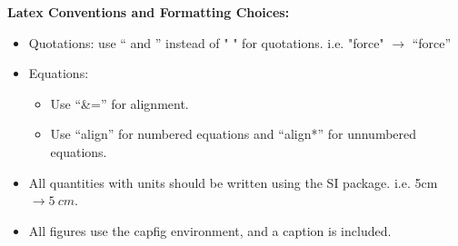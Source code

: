 \documentclass[11pt]{article}
\begin{document}
\textbf{Latex Conventions and Formatting Choices:}\\
\begin{itemize}
\item Quotations: use `` and '' instead of " " for quotations. i.e. "force" $\rightarrow$ ``force''
\item Equations:
\begin{itemize}
\item Use ``\&='' for alignment.
\item Use ``align'' for numbered equations and ``align*'' for unnumbered equations.
\end{itemize}
\item All quantities with units should be written using the SI package. i.e. 5cm $\rightarrow \SI{5}{cm}$.
\item All figures use the capfig environment, and a caption is included.


\end{itemize}
\end{document}
